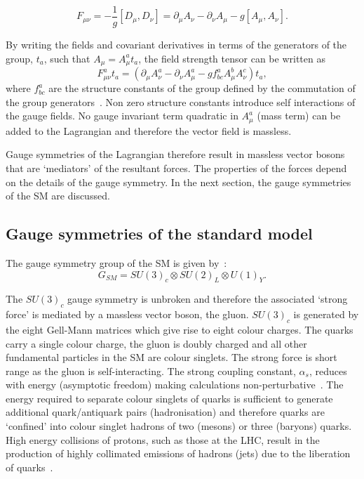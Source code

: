 \begin{equation}
F_{\mu\nu} = - \frac{1}{g}\left[D_{\mu},D_{\nu}\right] = \partial_{\mu}A_{\nu} - \partial_{\nu} A_{\mu} - g\left[A_{\mu},A_{\nu}\right].
\end{equation}

By writing the fields and covariant derivatives in terms of the generators of the group, $t_{a}$, such
that $A_{\mu} = A^{a}_{\mu} t_{a}$, the field strength tensor can be written as 
\begin{equation}
F^{a}_{\mu\nu}t_{a} = \left(\partial_{\mu}A^{a}_{\nu} - \partial_{\nu} A^{a}_{\mu} - g f_{bc}^{a}A^b_{\mu}A^c_{\nu}\right)t_a,
\end{equation}
where $f_{bc}^{a}$ are the structure constants of the group defined by the 
commutation of the group generators~\cite{wei1963lie}. Non zero structure constants introduce
self interactions of the gauge fields. No gauge invariant term quadratic 
in $A^a_\mu$ (mass term) can be added to the Lagrangian and 
therefore the vector field is massless.

Gauge symmetries of the Lagrangian therefore result in massless vector 
bosons that are `mediators' of the resultant forces. The properties of
the forces depend on the details of the gauge symmetry. 
In the next section, the gauge symmetries
of the SM are discussed. 

\subsection{Gauge symmetries of the standard model}
\label{sec:sm-gs}
The gauge symmetry group of the SM is given by~\cite{ewk-int}:
\begin{equation}
G_{SM} = SU(3)_{c}\otimes SU(2)_{L}\otimes U(1)_{Y}.
\end{equation}

The $SU(3)_c$ gauge symmetry is unbroken and therefore the associated
`strong force' is mediated by a massless vector boson, the gluon.
$SU(3)_c$ is generated by the eight Gell-Mann matrices which give rise to eight colour charges. 
The quarks carry a single colour charge, the gluon is doubly charged and all 
other fundamental particles in the SM are colour singlets. The strong force is short range
as the gluon is self-interacting.  The strong coupling constant, $\alpha_s$, 
reduces with energy (asymptotic freedom)
making calculations non-perturbative~\cite{qcd}. The energy required to separate 
colour singlets of quarks is sufficient to generate additional quark/antiquark pairs
(hadronisation) and therefore quarks are `confined' into colour singlet hadrons
of two (mesons) or three (baryons) quarks. High energy collisions of protons, 
such as those at the LHC, result in the production of highly 
collimated emissions of hadrons (jets) due to the 
liberation of quarks~\cite{salam}.


